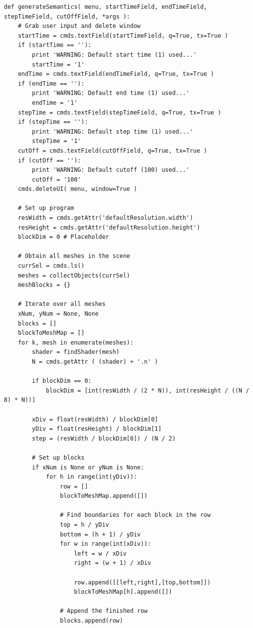 \documentclass[conference]{IEEEtran}
\begin{document}
{\begin{verbatim}
def generateSemantics( menu, startTimeField, endTimeField, stepTimeField, cutOffField, *args ):
    # Grab user input and delete window
    startTime = cmds.textField(startTimeField, q=True, tx=True )
    if (startTime == ''):
        print 'WARNING: Default start time (1) used...'
        startTime = '1'
    endTime = cmds.textField(endTimeField, q=True, tx=True )
    if (endTime == ''):
        print 'WARNING: Default end time (1) used...'
        endTime = '1'
    stepTime = cmds.textField(stepTimeField, q=True, tx=True )
    if (stepTime == ''):
        print 'WARNING: Default step time (1) used...'
        stepTime = '1'
    cutOff = cmds.textField(cutOffField, q=True, tx=True )
    if (cutOff == ''):
        print 'WARNING: Default cutoff (100) used...'
        cutOff = '100'
    cmds.deleteUI( menu, window=True )
    
    # Set up program
    resWidth = cmds.getAttr('defaultResolution.width')
    resHeight = cmds.getAttr('defaultResolution.height')
    blockDim = 0 # Placeholder
                
    # Obtain all meshes in the scene
    currSel = cmds.ls()
    meshes = collectObjects(currSel)
    meshBlocks = {}
    
    # Iterate over all meshes
    xNum, yNum = None, None
    blocks = []
    blockToMeshMap = []
    for k, mesh in enumerate(meshes):
        shader = findShader(mesh)
        N = cmds.getAttr ( (shader) + '.n' )
        
        if blockDim == 0:
            blockDim = [int(resWidth / (2 * N)), int(resHeight / ((N / 8) * N))]
        
        xDiv = float(resWidth) / blockDim[0]
        yDiv = float(resHeight) / blockDim[1]
        step = (resWidth / blockDim[0]) / (N / 2)
        
        # Set up blocks
        if xNum is None or yNum is None:
            for h in range(int(yDiv)):
                row = []
                blockToMeshMap.append([])
                
                # Find boundaries for each block in the row
                top = h / yDiv
                bottom = (h + 1) / yDiv
                for w in range(int(xDiv)):
                    left = w / xDiv
                    right = (w + 1) / xDiv
                    
                    row.append([[left,right],[top,bottom]])
                    blockToMeshMap[h].append([])
                    
                # Append the finished row
                blocks.append(row)
            

\end{verbatim}}
\end{document}
